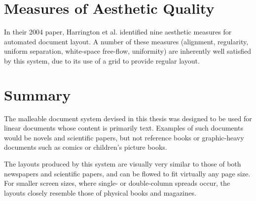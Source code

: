 \section{Measures of Aesthetic Quality}
In their 2004 paper, Harrington et al.\hspace{0pt}\cite{Harrington2004} identified nine aesthetic measures for automated document layout. A number of these measures (alignment, regularity, uniform separation, white-space free-flow, uniformity) are inherently well satisfied by this system, due to its use of a grid to provide regular layout. 





\section{Summary}
The malleable document system devised in this thesis was designed to be used for linear documents whose content is primarily text. Examples of such documents would be novels and scientific papers, but not reference books or graphic-heavy documents such as comics or children's picture books.

The layouts produced by this system are visually very similar to those of both newspapers and scientific papers, and can be flowed to fit virtually any page size. For smaller screen sizes, where single- or double-column spreads occur, the layouts closely resemble those of physical books and magazines.

